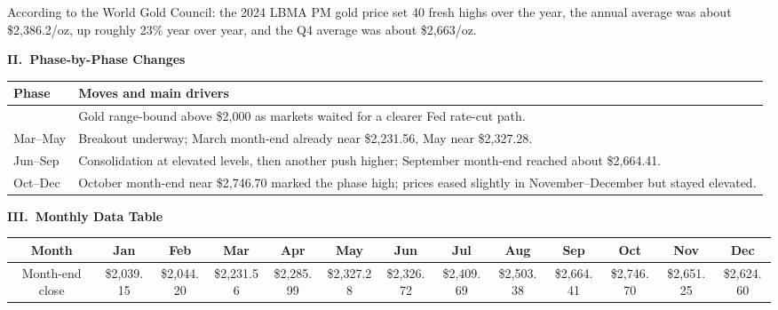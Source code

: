 \documentclass[11pt,a4paper]{article}
\newcommand{\secgold}[1]{%
  \vspace{0.55em}%
  {\large\color{sectiongold}\textbf{#1}}\par
  \vspace{0.15em}%
}
\begin{document}
According to the World Gold Council: the 2024 LBMA PM gold price set 40 fresh highs over the year, the annual average was about \$2,386.2/oz, up roughly 23\% year over year, and the Q4 average was about \$2,663/oz.

\secgold{II.\ Phase-by-Phase Changes}

\renewcommand{\arraystretch}{1.25}
\begin{center}
\begin{tabular}{|>{\centering\arraybackslash}p{}
               |>{\raggedright\arraybackslash}p{}|}
\hline
\rowcolor{headerbg}
{\footnotesize\textbf{Phase}} &
{\footnotesize\textbf{Moves and main drivers}} \\
\hline
{\footnotesize Jan--Feb} &
{\footnotesize Gold range-bound above \$2,000 as markets waited for a clearer Fed rate-cut path.} \\
\hline
{\footnotesize Mar--May} &
{\footnotesize Breakout underway; March month-end already near \$2,231.56, May near \$2,327.28.} \\
\hline
{\footnotesize Jun--Sep} &
{\footnotesize Consolidation at elevated levels, then another push higher; September month-end reached about \$2,664.41.} \\
\hline
{\footnotesize Oct--Dec} &
{\footnotesize October month-end near \$2,746.70 marked the phase high; prices eased slightly in November--December but stayed elevated.} \\
\hline
\end{tabular}
\end{center}

\clearpage

\secgold{III.\ Monthly Data Table}

\renewcommand{\arraystretch}{1.35}
{\fontsize{6.5pt}{8pt}\selectfont
\begin{center}
\setlength{\tabcolsep}{1.6pt}
\begin{tabular*}{\textwidth}{|@{\extracolsep{\fill}}c|*{12}{c}|}
\hline
\rowcolor{headerbg}
\textbf{Month} &
\textbf{Jan} & \textbf{Feb} & \textbf{Mar} & \textbf{Apr} &
\textbf{May} & \textbf{Jun} & \textbf{Jul} & \textbf{Aug} &
\textbf{Sep} & \textbf{Oct} & \textbf{Nov} & \textbf{Dec} \\
\hline
Month-end close &
\$2,039.15 & \$2,044.20 & \$2,231.56 & \$2,285.99 &
\$2,327.28 & \$2,326.72 & \$2,409.69 & \$2,503.38 &
\$2,664.41 & \$2,746.70 & \$2,651.25 & \$2,624.60 \\
\hline
\end{tabular*}
\end{center}
}
\end{document}
